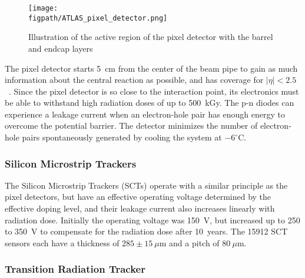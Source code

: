 \begin{figure}[h!tbp]
\centering
\texttt{[image: \\figpath/ATLAS\_pixel\_detector.png]}
\caption{Illustration of the active region of the pixel detector with the barrel and endcap layers~\cite{Aad:2008Jinst}}
\label{ATLAS-PixelDetector}
\end{figure}

The pixel detector starts 5~cm from the center of the beam pipe to gain as much information about the central reaction as possible, and has coverage for $|\eta| < 2.5$~\cite{Detector_challenges}.
Since the pixel detector is so close to the interaction point, its electronics must be able to withstand high radiation doses of up to 500~kGy.  The p-n diodes can experience a leakage current when an electron-hole pair has enough energy to overcome the potential barrier.  
The detector minimizes the number of electron-hole pairs spontaneously generated by cooling the system at $-6^\circ$C.

\subsubsection{Silicon Microstrip Trackers}
The Silicon Microstrip Trackers (SCTs) operate with a similar principle as the pixel detectors, but have an effective operating voltage determined by the effective doping level, and their leakage current also increases linearly with radiation dose.
Initially the operating voltage was 150~V, but increased up to 250 to 350~V to compensate for the radiation dose after 10~years.
The 15912 SCT sensors each have a thickness of $285\pm15~\mu$m and a pitch of $80~\mu$m.

\subsubsection{Transition Radiation Tracker}
\label{trt}

